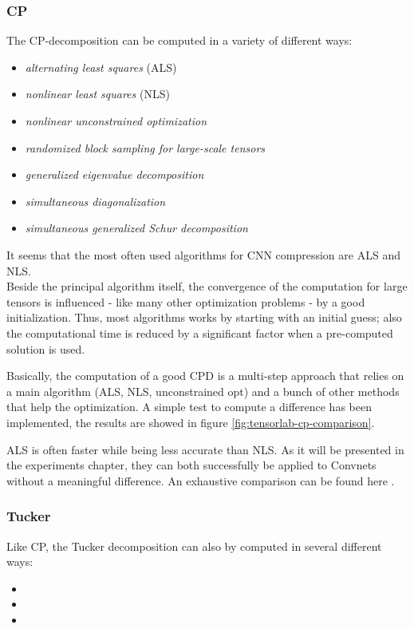\subsubsection{CP}
The CP-decomposition can be computed in a variety of different ways: 
    \begin{itemize}
        \item \emph{alternating least squares} (ALS)
        \item \emph{nonlinear least squares} (NLS)
        \item \emph{nonlinear unconstrained optimization}
        \item \emph{randomized block sampling for large-scale tensors}
        \item \emph{generalized eigenvalue decomposition}
        \item \emph{simultaneous diagonalization}
        \item \emph{simultaneous generalized Schur decomposition}
\end{itemize}
It seems that the most often used algorithms for CNN compression are ALS and NLS. \\
Beside the principal algorithm itself, the convergence of the computation for large tensors is influenced - like many other optimization problems - by a good initialization. Thus, most algorithms works by starting with an initial guess; also the computational time is reduced by a significant factor when a pre-computed solution is used. 
\newline

Basically, the computation of a good CPD is a multi-step approach that relies on a main algorithm (ALS, NLS, unconstrained opt) and a bunch of other methods that help the optimization. 
A simple test to compute a difference has been implemented, the results are showed in figure \ref{fig:tensorlab-cp-comparison}.
\newline 

ALS is often faster while being less accurate than NLS. As it will be presented in the experiments chapter, they can both successfully be applied to Convnets without a meaningful difference. 
An exhaustive comparison can be found here \parencite{WCPD-talk}. 

\subsubsection{Tucker}
Like CP, the Tucker decomposition can also by computed in several different ways: 
\begin{itemize}
    \item 
    
    \item 
    
    \item 
\end{itemize}

